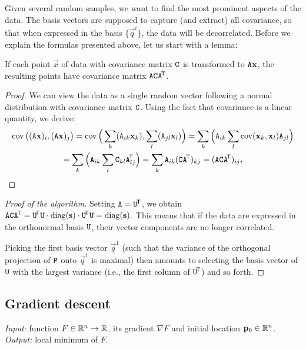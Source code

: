 Given several random samples, we want to find the most prominent aspects of the data.
The basis vectors are supposed to capture (and extract) all covariance, so that when expressed in the basis $\{\vec q^i\}$, the data will be decorrelated.
Before we explain the formulas presented above, let us start with a lemma:

\begin{lemma}
If each point $\vec x$ of data with covariance matrix $\mathtt{C}$ is transformed to $\mathtt{A} \mathbf{x}$, the resulting points have covariance matrix $\mathtt{A} \mathtt{C} \mathtt{A} ^{\!\mathsf{T}}$.
\end{lemma}

\begin{proof}
We can view the data as a single random vector following a normal distribution with covariance matrix $\mathtt{C}$.
Using the fact that covariance is a linear quantity, we derive:
\begin{multline}
\operatorname{\textrm{cov}}\big( (\mathtt{A} \mathbf{x})_i, (\mathtt{A} \mathbf{x})_j \big) = \operatorname{\textrm{cov}}\Big( \sum_k(\mathtt{A}_{ik} \mathbf{x}_k), \sum_l(\mathtt{A}_{jl} \mathbf{x}_l) \Big) = \sum_k \Big( \mathtt{A}_{ik} \sum_l \operatorname{\textrm{cov}}( \mathbf{x}_k, \mathbf{x}_l ) \mathtt{A}_{jl} \Big) \\
= \sum_k \Big( \mathtt{A}_{ik} \sum_l \mathtt{C}_{kl} \mathtt{A}_{lj}^{\!\mathsf{T}} \Big) = \sum_k \mathtt{A}_{ik} (\mathtt{C} \mathtt{A} ^{\!\mathsf{T}})_{kj} = (\mathtt{A} \mathtt{C} \mathtt{A}^{\!\mathsf{T}})_{ij},
\end{multline}
\end{proof}

\begin{proof}[Proof of the algorithm]
Setting $\mathtt{A} = \mathtt{U}^{\!\mathsf{T}}$, we obtain $\mathtt{A} \mathtt{C} \mathtt{A} ^{\!\mathsf{T}} = \mathtt{U}^{\!\mathsf{T}} \mathtt{U} \cdot \mathrm{diag}(\mathbf{s}) \cdot \mathtt{U}^{\!\mathsf{T}} \mathtt{U} = \mathrm{diag}(\mathbf{s})$.
This means that if the data are expressed in the orthonormal basis  $\mathtt{U}$, their vector components are no longer correlated.

Picking the first basis vector $\vec q^1$ (such that the variance of the orthogonal projection of $\mathtt{P}$ onto $\vec q^1$ is maximal) then amounts to selecting the basis vector of $\mathtt{U}$ with the largest variance (i.e., the first column of $\mathtt{U} ^{\!\mathsf{T}}$) and so forth.

\end{proof}

\subsection{Gradient descent}
\textit{Input:} function $F \in \mathbb{R}^n \to \mathbb{R}$, its gradient $\nabla F$ and initial location $\mathbf{p}_0 \in \mathbb{R}^n$.\\
\textit{Output:} local minimum of $F$.\\


